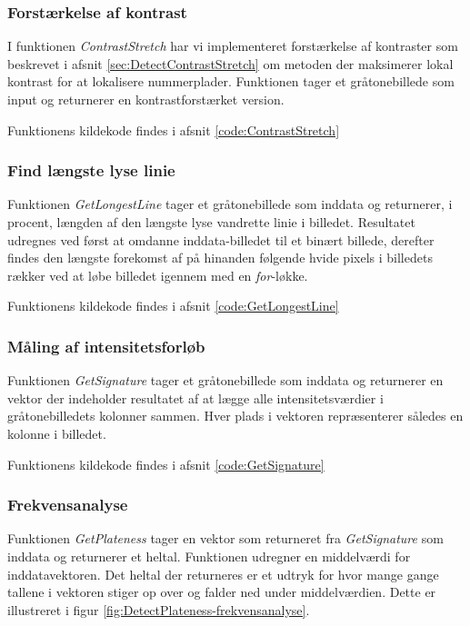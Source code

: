 \subsubsection{Forstærkelse af kontrast}
\label{sec:imp:ContrastStretch}
I funktionen \textit{ContrastStretch} har vi implementeret forstærkelse af kontraster som beskrevet i afsnit \vref{sec:DetectContrastStretch} om metoden der maksimerer lokal kontrast for at lokalisere nummerplader. Funktionen tager et gråtonebillede som input og returnerer en kontrastforstærket version. 

Funktionens kildekode findes i afsnit \vref{code:ContrastStretch}

\subsubsection{Find længste lyse linie}
\label{sec:imp:GetLongestLine}
Funktionen \textit{GetLongestLine} tager et gråtonebillede som inddata og returnerer, i procent, længden af den længste lyse vandrette linie i billedet. Resultatet udregnes ved først at omdanne inddata-billedet til et binært billede, derefter findes den længste forekomst af på hinanden følgende hvide pixels i billedets rækker ved at løbe billedet igennem med en \textit{for}-løkke.  

Funktionens kildekode findes i afsnit \vref{code:GetLongestLine}

\subsubsection{Måling af intensitetsforløb}
\label{sec:imp:GetSignature}
Funktionen \textit{GetSignature} tager et gråtonebillede som inddata og returnerer en vektor der indeholder resultatet af at lægge alle intensitetsværdier i gråtonebilledets kolonner sammen. Hver plads i vektoren repræsenterer således en kolonne i billedet.

Funktionens kildekode findes i afsnit \vref{code:GetSignature}

\subsubsection{Frekvensanalyse}
\label{sec:imp:GetPlateness}
Funktionen \textit{GetPlateness} tager en vektor som returneret fra \textit{GetSignature} som inddata og returnerer et heltal. Funktionen udregner en middelværdi for inddatavektoren. Det heltal der returneres er et udtryk for hvor mange gange tallene i vektoren stiger op over og falder ned under middelværdien. Dette er illustreret i figur \vref{fig:DetectPlateness-frekvensanalyse}.

